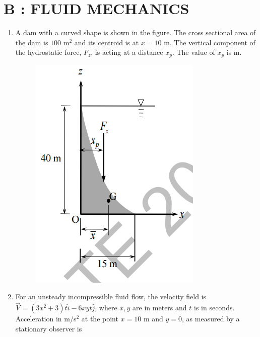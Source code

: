 \documentclass[a4paper,10pt]{article}
\begin{document}
\section*{B : FLUID MECHANICS}
\begin{enumerate}
    \item A dam with a curved shape is shown in the figure. The cross sectional area of the dam  is $100 \text{ m}^2$ and its centroid is at $\bar{x} = 10 \text{ m}$. The vertical component of the hydrostatic force, $F_z$, is acting at a distance $x_p$. The value of $x_p$ is \underline{\hspace{2cm}} m.
    \begin{figure}[H] 
        \centering 
        \includegraphics[width=0.4\columnwidth]{Bq1.png} \caption*{} 
        \label{fig:q1_fluid} 
    \end{figure}
    
    \hfill{}

    \item For an unsteady incompressible fluid flow, the velocity field is $\vec{V} = (3x^2 +3)t \hat{i} - 6xyt \hat{j}$, where $x, y$ are in meters and $t$ is in seconds. Acceleration in m/s$^2$ at the point $x=10$ m and $y=0$, as measured by a stationary observer is
    
    \hfill{}
    \begin{enumerate}
    \end{enumerate}


\end{enumerate}
\end{document}
